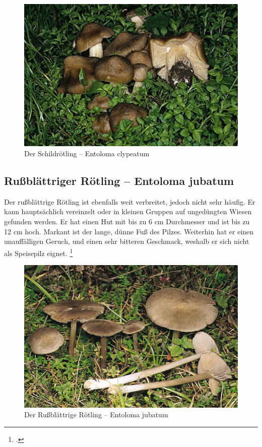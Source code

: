 \documentclass[a4paper,abstracton]{scrreprt}
\begin{document}
\begin{figure}[H]
\centering
\includegraphics[scale=12]{schildroetling}
\caption{Der Schildrötling -- Entoloma clypeatum }
\label{fig:schildroetling}
\end{figure}

\subsection{Rußblättriger Rötling -- Entoloma jubatum}
Der rußblättrige Rötling ist ebenfalls weit verbreitet, jedoch nicht sehr häufig. Er kann hauptsächlich vereinzelt oder in kleinen Gruppen auf ungedüngten Wiesen gefunden werden. Er hat einen Hut mit bis zu 6 cm Durchmesser und ist bis zu 12 cm hoch. Markant ist der lange, dünne Fuß des Pilzes. Weiterhin hat er einen unauffälligen Geruch, und einen sehr bitteren Geschmack, weshalb er sich nicht als Speisepilz eignet.
\footcite{russblaettrig}
\begin{figure}[H]
\centering
\includegraphics[scale=0.3]{russblaettrig}
\caption{Der Rußblättrige Rötling -- Entoloma jubatum }
\label{fig:russblaettrig}
\end{figure}
\end{document}
